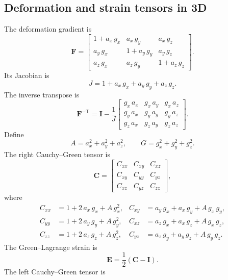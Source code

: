 \documentclass[11pt,a4paper]{article}
\newcommand{\Id}{\textbf{I}}
\begin{document}
\subsection{Deformation and strain tensors in 3D}

The deformation gradient is
%
\begin{equation}
\boxed{
\textbf{F}=\begin{bmatrix}
1+a_x\,g_x&a_x\,g_y&a_x\,g_z\\
a_y\,g_x&1+a_y\,g_y&a_y\,g_z\\
a_z\,g_x&a_z\,g_y&1+a_z\,g_z
\end{bmatrix}
}.
\label{eq_F3D}
\end{equation}
%
Its Jacobian is
%
\begin{equation}
\boxed{J=1+a_x\,g_x+a_y\,g_y+a_z\,g_z}.
\label{eq_J3D}
\end{equation}
%
The inverse transpose is
%
\begin{equation}
\boxed{
\textbf{F}^{-\text{T}}=\Id-
\dfrac1J
\begin{bmatrix}
g_x\,a_x&g_x\,a_y&g_x\,a_z\\
g_y\,a_x&g_y\,a_y&g_y\,a_z\\
g_z\,a_x&g_z\,a_y&g_z\,a_z
\end{bmatrix}
}.
\end{equation}
%
Define
%
\begin{equation}
A=a_x^2+a_y^2+a_z^2,
\qquad
G=g_x^2+g_y^2+g_z^2.
\end{equation}
%
The right Cauchy--Green tensor is
%
\begin{equation}
\boxed{
\textbf{C}=
\begin{bmatrix}
C_{xx}&C_{xy}&C_{xz}\\
C_{xy}&C_{yy}&C_{yz}\\
C_{xz}&C_{yz}&C_{zz}
\end{bmatrix}
},
\end{equation}
%
where
%
\begin{align}
C_{xx}&=1+2\,a_x\,g_x+A\,g_x^2,
&C_{xy}&=a_y\,g_x+a_x\,g_y+A\,g_x\,g_y,
\\
C_{yy}&=1+2\,a_y\,g_y+A\,g_y^2,
&C_{xz}&=a_z\,g_x+a_x\,g_z+A\,g_x\,g_z,
\\
C_{zz}&=1+2\,a_z\,g_z+A\,g_z^2,
&C_{yz}&=a_z\,g_y+a_y\,g_z+A\,g_y\,g_z.
\end{align}
%
The Green--Lagrange strain is
%
\begin{equation}
\boxed{\textbf{E}=\dfrac12(\textbf{C}-\Id)}.
\end{equation}
%
The left Cauchy--Green tensor is
\end{document}
